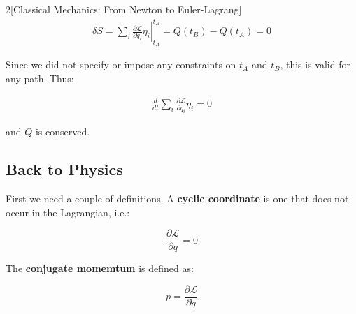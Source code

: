 \documentclass{article}
\begin{document}
\begin{multicols}{2}[Classical Mechanics: From Newton to Euler-Lagrang]
\begin{align*}
    \delta S = \sum_i \left. \frac{\partial \mathcal{L}}{\partial \dot{q}_i} \eta_i \right\vert_{t_A}^{t_B} = Q(t_B) - Q(t_A) = 0
\end{align*}

Since we did not specify or impose any constraints on $t_A$ and $t_B$, this is valid for any path. Thus:

\begin{align*}
    \frac{d}{dt} \sum_i \frac{\partial \mathcal{L}}{\partial \dot{q}_i} \eta_i = 0
\end{align*}

and $Q$ is conserved.


\subsection{Back to Physics}
First we need a couple of definitions. A \textbf{cyclic coordinate} is one that does not occur in the Lagrangian, i.e.:

\begin{equation}
    \frac{\partial \mathcal{L}}{\partial q} = 0
\end{equation}

The \textbf{conjugate momemtum} is defined as:

\begin{equation}
    p = \frac{\partial \mathcal{L}}{\partial \dot{q}}
\end{equation}




\end{multicols}
\end{document}

